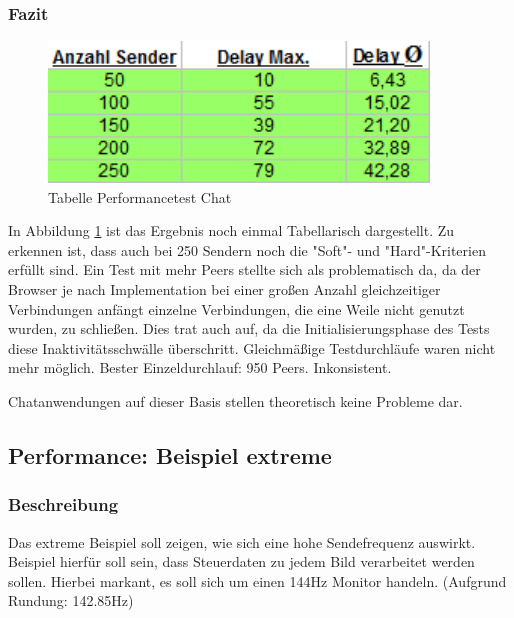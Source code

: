 \subsubsection{Fazit}
\begin{figure}[htH]
\centering
\includegraphics[width=0.9\textwidth]{backend/Tabelle_Performance_Chat.PNG}
\caption{Tabelle Performancetest Chat}
\label{backfig17}
\end{figure}
In Abbildung \ref{backfig17} ist das Ergebnis noch einmal Tabellarisch dargestellt.
Zu erkennen ist, dass auch bei 250 Sendern noch die "Soft"- und "Hard"-Kriterien erfüllt sind.
Ein Test mit mehr Peers stellte sich als problematisch da, da der Browser je nach Implementation bei einer großen Anzahl gleichzeitiger Verbindungen anfängt einzelne Verbindungen, die eine Weile nicht genutzt wurden, zu schließen. Dies trat auch auf, da die Initialisierungsphase des Tests diese Inaktivitätsschwälle überschritt. 
Gleichmäßige Testdurchläufe waren nicht mehr möglich.
Bester Einzeldurchlauf: 950 Peers. Inkonsistent.

Chatanwendungen auf dieser Basis stellen theoretisch keine Probleme dar.



\subsection{Performance: Beispiel extreme}
\subsubsection{Beschreibung}
Das extreme Beispiel soll zeigen, wie sich eine hohe Sendefrequenz auswirkt. Beispiel hierfür soll sein, dass Steuerdaten zu jedem Bild verarbeitet werden sollen. Hierbei markant, es soll sich um einen 144Hz Monitor handeln. (Aufgrund Rundung: 142.85Hz)



